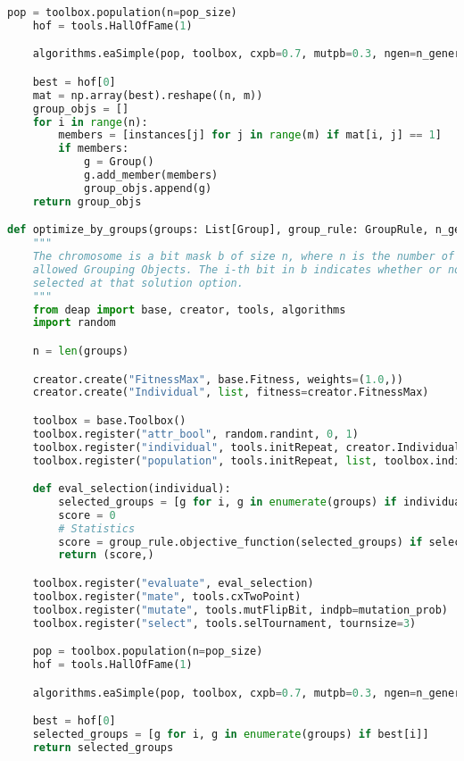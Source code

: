 \begin{apendicesenv}
\begin{lstlisting}[language=Python, caption={Genetic Algorithm Solver Source Code}]
    pop = toolbox.population(n=pop_size)
    hof = tools.HallOfFame(1)

    algorithms.eaSimple(pop, toolbox, cxpb=0.7, mutpb=0.3, ngen=n_generations, halloffame=hof, verbose=False)

    best = hof[0]
    mat = np.array(best).reshape((n, m))
    group_objs = []
    for i in range(n):
        members = [instances[j] for j in range(m) if mat[i, j] == 1]
        if members:
            g = Group()
            g.add_member(members)
            group_objs.append(g)
    return group_objs

def optimize_by_groups(groups: List[Group], group_rule: GroupRule, n_generations=10000, pop_size=30, mutation_prob=0.2) -> List[Group]:
    """
    The chromosome is a bit mask b of size n, where n is the number of
    allowed Grouping Objects. The i-th bit in b indicates whether or not the i-th grouping object is
    selected at that solution option.
    """
    from deap import base, creator, tools, algorithms
    import random

    n = len(groups)

    creator.create("FitnessMax", base.Fitness, weights=(1.0,))
    creator.create("Individual", list, fitness=creator.FitnessMax)

    toolbox = base.Toolbox()
    toolbox.register("attr_bool", random.randint, 0, 1)
    toolbox.register("individual", tools.initRepeat, creator.Individual, toolbox.attr_bool, n)
    toolbox.register("population", tools.initRepeat, list, toolbox.individual)

    def eval_selection(individual):
        selected_groups = [g for i, g in enumerate(groups) if individual[i]]
        score = 0
        # Statistics
        score = group_rule.objective_function(selected_groups) if selected_groups else 0
        return (score,)

    toolbox.register("evaluate", eval_selection)
    toolbox.register("mate", tools.cxTwoPoint)
    toolbox.register("mutate", tools.mutFlipBit, indpb=mutation_prob)
    toolbox.register("select", tools.selTournament, tournsize=3)

    pop = toolbox.population(n=pop_size)
    hof = tools.HallOfFame(1)

    algorithms.eaSimple(pop, toolbox, cxpb=0.7, mutpb=0.3, ngen=n_generations, halloffame=hof, verbose=False)

    best = hof[0]
    selected_groups = [g for i, g in enumerate(groups) if best[i]]
    return selected_groups


\end{lstlisting}
\end{apendicesenv}
